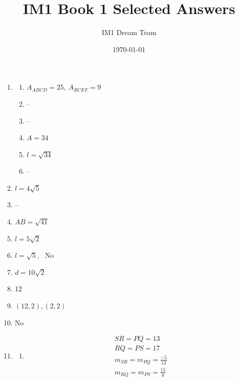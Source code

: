 \documentclass{article}
\title{IM1 Book 1 Selected Answers}
\author{IM1 Dream Team}
\date{\today}
\begin{document}
\maketitle

\begin{enumerate}

\item

	\begin{enumerate}
	
 	\item $A_{ABCD} = 25, \ A_{BCEF} = 9$
	
	\item --
	
	\item --
	
	\item $A = 34$
	
	\item $l = \sqrt{34}$
	
	\item --
	
	\end{enumerate}
	
\item $l = 4\sqrt{5}$

\item --

\item $AB = \sqrt{41}$

\item $l = 5\sqrt{2}$

\item $l = \sqrt{5}$, \ No

\item $d = 10\sqrt{2}$

\item 12

\item $(12, 2), (2, 2)$

\item No

\item

	\begin{enumerate}
	
	\item \begin{gather*}
		SR = PQ = 13 \\
		RQ = PS = 17 \\
		m_{SR} = m_{PQ} = \frac{-5}{12} \\
		m_{RQ} = m_{PS} = \frac{15}{8}
		\end{gather*}
		

\end{enumerate}
\end{enumerate}
\end{document}
